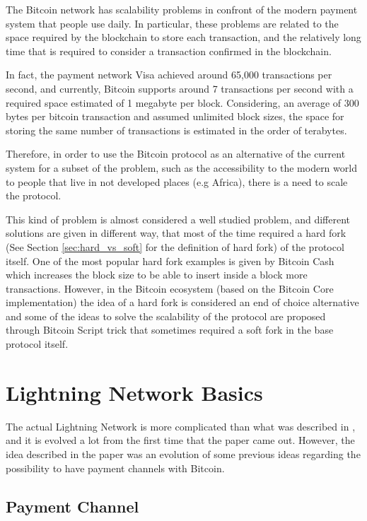 The Bitcoin network has scalability problems in confront of the modern payment system that people use daily.
In particular, these problems are related to the space required by the blockchain to store each transaction,
and the relatively long time that is required to consider a transaction confirmed in the blockchain.

In fact, the payment network Visa achieved around 65,000\cite{visa-sheet} transactions per second, and currently,
Bitcoin supports around 7 transactions per second with a required space estimated of 1 megabyte per block. Considering,
an average of 300 bytes per bitcoin transaction and assumed unlimited block sizes, the space for storing the same number
of transactions is estimated in the order of terabytes\cite{lightning-network-paper}.

Therefore, in order to use the Bitcoin protocol as an alternative of the current system for a subset of
the problem, such as the accessibility to the modern world to people that live in not developed places (e.g Africa),
there is a need to scale the protocol.

This kind of problem is almost considered a well studied problem, and different solutions are given in different
way, that most of the time required a hard fork (See Section \ref{sec:hard_vs_soft} for the definition of hard fork) of the protocol itself.
One of the most popular hard fork examples is given by Bitcoin Cash which increases the block size to be able to insert
inside a block more transactions.
However, in the Bitcoin ecosystem (based on the Bitcoin Core implementation) the idea of a hard fork is considered an
end of choice alternative and some of the ideas to solve the scalability of the protocol are proposed through Bitcoin Script trick
that sometimes required a soft fork in the base protocol itself.

\section{Lightning Network Basics}

The actual Lightning Network is more complicated than what was described in \cite{lightning-network-paper}, and it is
evolved a lot from the first time that the paper came out. However, the idea described in the paper was an evolution
of some previous ideas regarding the possibility to have payment channels with Bitcoin.

\subsection{Payment Channel}

